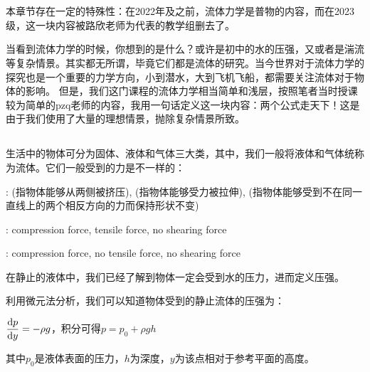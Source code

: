 \begin{comment}
    \documentclass{Physics_H_Notes}
    \usepackage{upgreek}
    
    \end{comment}
        \chapter[流体力学]{}
        本章节存在一定的特殊性：在2022年及之前，流体力学是普物的内容，而在2023级，这一块内容被路欣老师为代表的教学组删去了。

        当看到流体力学的时候，你想到的是什么？或许是初中的水的压强，又或者是湍流等复杂情景。其实都无所谓，毕竟它们都是流体的研究。当今世界对于流体力学的探究也是一个重要的力学方向，小到潜水，大到飞机飞船，都需要关注流体对于物体的影响。
        但是，我们这门课程的流体力学相当简单和浅层，按照笔者当时授课较为简单的pzq老师的内容，我用一句话定义这一块内容：两个公式走天下！这是由于我们使用了大量的理想情景，抛除复杂情景所致。
        \section[流体的定义与性质]{}
        生活中的物体可分为固体、液体和气体三大类，其中，我们一般将液体和气体统称为流体。它们一般受到的力是不一样的：
        \begin{Itemize}
            \item {}: (指物体能够从两侧被挤压), (指物体能够受力被拉伸), 
                (指物体能够受到不在同一直线上的两个相反方向的力而保持形状不变)
            \item {}: compression force, tensile force, no shearing force
            \item {}: compression force, no tensile force, no shearing force
        \end{Itemize}
        
        在静止的液体中，我们已经了解到物体一定会受到水的压力，进而定义压强。
        \begin{law}[静止流体中的压强]
            利用微元法分析，我们可以知道物体受到的静止流体的压强为：
            \begin{center}
                $\dfrac{\dif p}{\dif y}=-\rho g$，积分可得$p=p_0+\rho gh$
            \end{center}

            其中$p_0$是液体表面的压力，$h$为深度，$y$为该点相对于参考平面的高度。
        \end{law}
        
